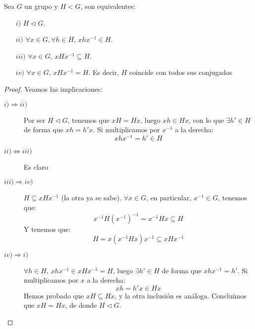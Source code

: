 \begin{prop}
    Sea $G$ un grupo y $H< G$, son equivalentes:
    \begin{enumerate}
        \item[$i)$] $H\lhd G$.
        \item[$ii)$] $\forall x\in G, \forall h\in H$, $xhx^{-1}\in H$.
        \item[$iii)$] $\forall x\in G$, $xHx^{-1}\subseteq H$.
        \item[$iv)$] $\forall x\in G$, $xHx^{-1}= H$. Es decir, $H$ coincide con todos sus conjugados
    \end{enumerate}
    \begin{proof}
        Veamos las implicaciones:
        \begin{description}
            \item [$i)\Longrightarrow ii)$] Por ser $H\lhd G$, tenemos que $xH = Hx$, luego $xh\in Hx$, con lo que $\exists h'\in H$ de forma que $xh = h'x$. Si multiplicamos por $x^{-1}$ a la derecha:
                \begin{equation*}
                    xhx^{-1} = h' \in H
                \end{equation*}
            \item [$ii)\Longleftrightarrow iii)$] Es claro
            \item [$iii)\Longrightarrow iv)$] $H\subseteq xHx^{-1}$ (la otra ya se sabe). $\forall x\in G$, en particular, $x^{-1}\in G$, tenemos que:
                \begin{equation*}
                    x^{-1}H{(x^{-1})}^{-1} = x^{-1}Hx \subseteq H
                \end{equation*}
                Y tenemos que:
                \begin{equation*}
                    H = x(x^{-1}Hx)x^{-1} \subseteq xHx^{-1}
                \end{equation*}
            \item [$iv)\Longrightarrow i)$] $\forall h\in H$, $xhx^{-1}\in xHx^{-1} = H$, luego $\exists h'\in H$ de forma que $xhx^{-1} = h'$. Si multiplicamos por $x$ a la derecha:
                \begin{equation*}
                    xh = h'x \in Hx
                \end{equation*}
                Hemos probado que $xH\subseteq Hx$, y la otra inclusión es análoga. Concluimos que $xH = Hx$, de donde $H\lhd G$.
        \end{description}
    \end{proof}
\end{prop}

